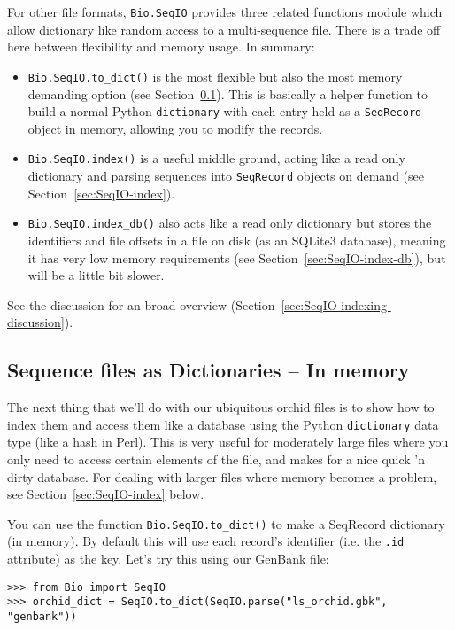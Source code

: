 For other file formats, \verb|Bio.SeqIO| provides three related functions
module which allow dictionary like random access to a multi-sequence file.
There is a trade off here between flexibility and memory usage. In summary:
\begin{itemize}
\item \verb|Bio.SeqIO.to_dict()| is the most flexible but also the most
memory demanding option (see Section~\ref{sec:seqio_todict}). This is basically
a helper function to build a normal Python \verb|dictionary| with each entry
held as a \verb|SeqRecord| object in memory, allowing you to modify the
records.
\item \verb|Bio.SeqIO.index()| is a useful middle ground, acting like a
read only dictionary and parsing sequences into \verb|SeqRecord| objects
on demand (see Section~\ref{sec:SeqIO-index}).
\item \verb|Bio.SeqIO.index_db()| also acts like a read only dictionary
but stores the identifiers and file offsets in a file on disk (as an
SQLite3 database), meaning it has very low memory requirements (see
Section~\ref{sec:SeqIO-index-db}), but will be a little bit slower.
\end{itemize}
See the discussion for an broad overview
(Section~\ref{sec:SeqIO-indexing-discussion}).

\subsection{Sequence files as Dictionaries -- In memory}
\label{sec:seqio_todict}

The next thing that we'll do with our ubiquitous orchid files is to show how
to index them and access them like a database using the Python \verb|dictionary|
data type (like a hash in Perl). This is very useful for moderately large files
where you only need to access certain elements of the file, and makes for a nice
quick 'n dirty database. For dealing with larger files where memory becomes a
problem, see Section~\ref{sec:SeqIO-index} below.

You can use the function \verb|Bio.SeqIO.to_dict()| to make a SeqRecord dictionary
(in memory).  By default this will use each record's identifier (i.e. the \verb|.id|
attribute) as the key.  Let's try this using our GenBank file:

\begin{verbatim}
>>> from Bio import SeqIO
>>> orchid_dict = SeqIO.to_dict(SeqIO.parse("ls_orchid.gbk", "genbank"))
\end{verbatim}

